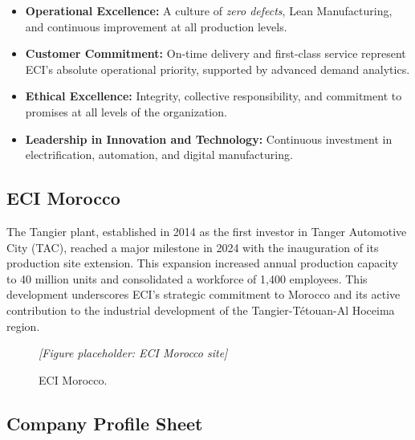 \begin{itemize}
  \item \textbf{Operational Excellence:} A culture of \textit{zero defects}, Lean Manufacturing, and continuous improvement at all production levels.
  \item \textbf{Customer Commitment:} On-time delivery and first-class service represent ECI's absolute operational priority, supported by advanced demand analytics.
  \item \textbf{Ethical Excellence:} Integrity, collective responsibility, and commitment to promises at all levels of the organization.
  \item \textbf{Leadership in Innovation and Technology:} Continuous investment in electrification, automation, and digital manufacturing.
\end{itemize}

\subsection{ECI Morocco}

The Tangier plant, established in 2014 as the first investor in Tanger Automotive City (TAC), reached a major milestone in 2024 with the inauguration of its production site extension. This expansion increased annual production capacity to 40 million units and consolidated a workforce of 1,400 employees. This development underscores ECI's strategic commitment to Morocco and its active contribution to the industrial development of the Tangier-T\'{e}touan-Al Hoceima region.

\begin{figure}[H]
  \centering
  \textit{[Figure placeholder: ECI Morocco site]}
  \caption{ECI Morocco.}
  \label{fig:eci-morocco}
\end{figure}

\subsection{Company Profile Sheet}


